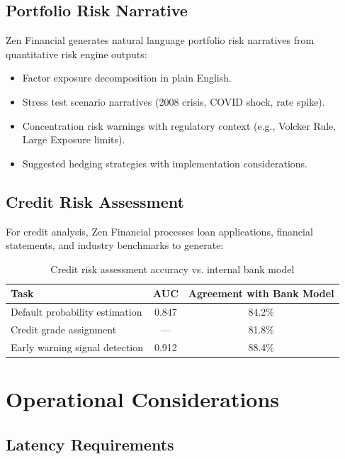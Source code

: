 \documentclass[11pt,a4paper]{article}
\begin{document}
\subsection{Portfolio Risk Narrative}

Zen Financial generates natural language portfolio risk narratives from quantitative risk engine outputs:

\begin{itemize}
  \item Factor exposure decomposition in plain English.
  \item Stress test scenario narratives (2008 crisis, COVID shock, rate spike).
  \item Concentration risk warnings with regulatory context (e.g., Volcker Rule, Large Exposure limits).
  \item Suggested hedging strategies with implementation considerations.
\end{itemize}

\subsection{Credit Risk Assessment}

For credit analysis, Zen Financial processes loan applications, financial statements, and industry benchmarks to generate:

\begin{table}[H]
\centering
\caption{Credit risk assessment accuracy vs. internal bank model}
\label{tab:credit}
\begin{tabular}{lcc}
\toprule
Task & AUC & Agreement with Bank Model \\
\midrule
Default probability estimation & 0.847 & 84.2\% \\
Credit grade assignment & — & 81.8\% \\
Early warning signal detection & 0.912 & 88.4\% \\
\bottomrule
\end{tabular}
\end{table}

\section{Operational Considerations}

\subsection{Latency Requirements}
\end{document}
